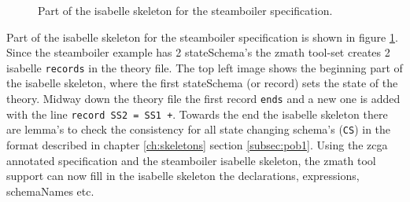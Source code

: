 \begin{figure}[H]
    \hfill
    \hfill
    \hfill
    \caption{Part of the isabelle skeleton for the steamboiler specification.\label{fig:steamisaskel}}
\end{figure}

Part of the isabelle skeleton for the steamboiler specification is shown in
figure \ref{fig:steamisaskel}. Since the steamboiler example has 2 stateSchema's
the \gls{zmath} tool-set creates 2 isabelle 	\texttt{records} in the theory file.
The top left image shows the beginning part of the isabelle skeleton, where the
first stateSchema (or record) sets the state of the theory. Midway down the
theory file the first record \texttt{ends} and a new one is added with the line
\verb|record SS2 = SS1 +|. Towards the end the isabelle skeleton there are
lemma's to check the consistency for all state changing schema's (\texttt{CS})
in the format described in chapter \ref{ch:skeletons} section \ref{subsec:pob1}.
Using the \gls{zcga} annotated specification and the steamboiler isabelle
skeleton, the \gls{zmath} tool support can now fill in the isabelle skeleton the
declarations, expressions, schemaNames etc.


